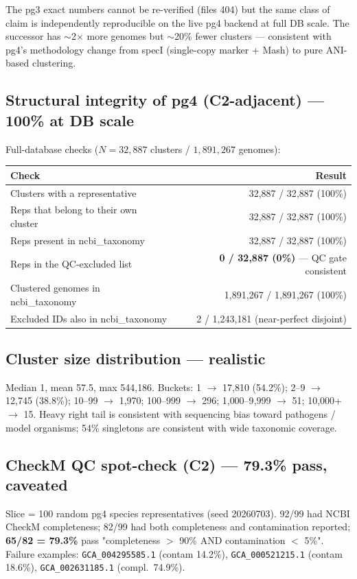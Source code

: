 \documentclass[11pt]{article}
\begin{document}
The pg3 exact numbers cannot be re-verified (files 404) but the same class of
claim is independently reproducible on the live pg4 backend at full DB scale.
The successor has $\sim$2$\times$ more genomes but $\sim$20\% fewer clusters ---
consistent with pg4's methodology change from specI (single-copy marker + Mash) to
pure ANI-based clustering.

\subsection{Structural integrity of pg4 (C2-adjacent) --- \textcolor{green!50!black}{100\% at DB scale}}

Full-database checks ($N = 32{,}887$ clusters / $1{,}891{,}267$ genomes):

\begin{center}
\begin{tabular}{lr}
\toprule
Check & Result \\
\midrule
Clusters with a representative & 32{,}887 / 32{,}887 (100\%) \\
Reps that belong to their own cluster & 32{,}887 / 32{,}887 (100\%) \\
Reps present in ncbi\_taxonomy & 32{,}887 / 32{,}887 (100\%) \\
Reps in the QC-excluded list & \textbf{0 / 32{,}887 (0\%)} --- QC gate consistent \\
Clustered genomes in ncbi\_taxonomy & 1{,}891{,}267 / 1{,}891{,}267 (100\%) \\
Excluded IDs also in ncbi\_taxonomy & 2 / 1{,}243{,}181 (near-perfect disjoint) \\
\bottomrule
\end{tabular}
\end{center}

\subsection{Cluster size distribution --- realistic}
Median 1, mean 57.5, max 544{,}186. Buckets: 1 $\to$ 17{,}810 (54.2\%); 2--9 $\to$ 12{,}745 (38.8\%); 10--99 $\to$ 1{,}970; 100--999 $\to$ 296; 1{,}000--9{,}999 $\to$ 51; 10{,}000+ $\to$ 15. Heavy right tail is consistent with sequencing bias toward pathogens / model organisms; 54\% singletons are consistent with wide taxonomic coverage.

\subsection{CheckM QC spot-check (C2) --- 79.3\% pass, caveated}
Slice = 100 random pg4 species representatives (seed 20260703). 92/99 had NCBI CheckM completeness; 82/99 had both completeness and contamination reported; \textbf{65/82 = 79.3\%} pass "completeness $>$ 90\% AND contamination $<$ 5\%". Failure examples: \texttt{GCA\_004295585.1} (contam 14.2\%), \texttt{GCA\_000521215.1} (contam 18.6\%), \texttt{GCA\_002631185.1} (compl.\ 74.9\%).
\end{document}
